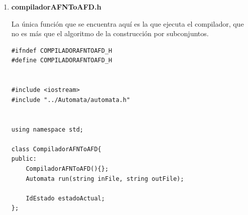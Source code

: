 \documentclass[a4paper,12pt]{article}
\begin{document}
\begin{enumerate}
\begin{lstlisting}
vector<Estado *> Automata::e_clausura(vector<Estado *> estadosV){
    vector<Estado *> res;
    for(Estado * estado : estadosV){
        vector<Estado *> temp = e_clausura(estado);
        res.insert(res.begin(),temp.begin(),temp.end());
    }
    res = deleteRepeat(res);
    return res;
}

vector<Estado *> Automata::findTransiciones(vector<Estado *> estadosV, char caracter){
    vector<Estado *> res;
    Estado * estado1 = nullptr;
    Estado * estado2 = nullptr;
    char entrada;
    for(Estado * estado : estadosV){
        for(Transicion transicion : estado->transiciones){
            tie(estado1, entrada, estado2) = transicion;
            if(entrada == caracter) res.push_back(estado2);
        }
    }
    res = deleteRepeat(res);
    return res;
}

Estado * Automata::findSubConjunto(vector<Estado *> subConjunto){
    if(subConjunto.empty()) return nullptr;
    vector<IdEstado> subConjuntoId;
    string comp = "[";
    for(Estado * estado : subConjunto){
        subConjuntoId.push_back(estado->id);
    }
    sort(subConjuntoId.begin(),subConjuntoId.end());
    for(IdEstado id : subConjuntoId){
        comp = comp + to_string(id) + " ";
    }
    comp.pop_back();
    comp.push_back(']');
    for(Estado * estado : estados){
        if(!estado->cadenaSubConjunto.empty()){
            if(estado->cadenaSubConjunto == comp) return estado;    
        }
    }
    return nullptr;
}

bool Automata::esAceptacion(IdEstado id){
    for(Estado * estado : aceptacion){
        if(estado->id == id) return true;
    }
    return false;
}


#endif
 \end{lstlisting}

 \item \textbf{compiladorAFNToAFD.h} \par
 La única función que se encuentra aquí es la que ejecuta el compilador, que no es más que el algoritmo de la construcción por subconjuntos.
 
 
 \begin{lstlisting}
#ifndef COMPILADORAFNTOAFD_H
#define COMPILADORAFNTOAFD_H


#include <iostream>
#include "../Automata/automata.h"


using namespace std;

class CompiladorAFNToAFD{
public:
    CompiladorAFNToAFD(){};
    Automata run(string inFile, string outFile);

    IdEstado estadoActual;
};


\end{lstlisting}
\end{enumerate}
\end{document}
